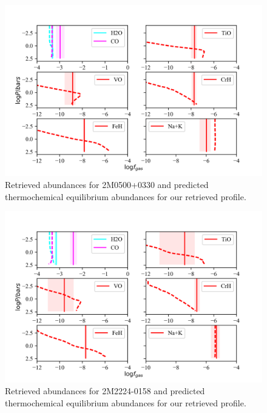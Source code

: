 \documentclass[useAMS,usenatbib]{mn2e}
\begin{document}

\begin{figure}
\hspace{-0.8cm}
\includegraphics[width=350pt]{2M0500_abundances_UCL.png}
\caption{Retrieved abundances for 2M0500+0330 and predicted thermochemical equilibrium abundances for our retrieved profile. 
\label{fig:2m0500abund}}
\end{figure}


\begin{figure}
\hspace{-0.8cm}
\includegraphics[width=350pt]{2M2224_abundances_UCL.png}
\caption{Retrieved abundances for 2M2224-0158 and predicted thermochemical equilibrium abundances for our retrieved profile. 
\label{fig:2m2224abund}}
\end{figure}
\end{document}
